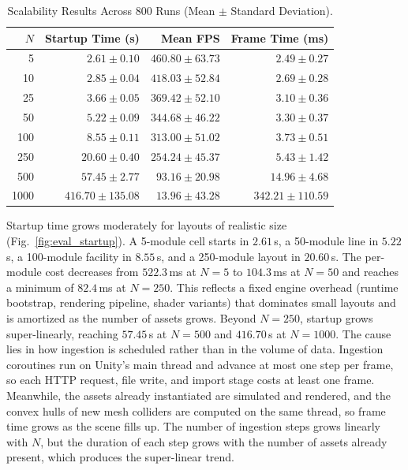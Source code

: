 \documentclass{ieeeojies}
\begin{document}
\begin{table}[t]
\centering
\caption{Scalability Results Across 800 Runs (Mean $\pm$ Standard Deviation).}
\label{tab:consolidated_results}
\renewcommand{\arraystretch}{1.25}
\begin{tabular*}{\columnwidth}{@{\extracolsep{\fill}}rrrr@{}}
\toprule
\textbf{$N$} & \textbf{Startup Time (s)} & \textbf{Mean FPS} & \textbf{Frame Time (ms)} \\
\midrule
5    & $2.61 \pm 0.10$     & $460.80 \pm 63.73$ & $2.49 \pm 0.27$    \\
10   & $2.85 \pm 0.04$     & $418.03 \pm 52.84$ & $2.69 \pm 0.28$    \\
25   & $3.66 \pm 0.05$     & $369.42 \pm 52.10$ & $3.10 \pm 0.36$    \\
50   & $5.22 \pm 0.09$     & $344.68 \pm 46.22$ & $3.30 \pm 0.37$    \\
100  & $8.55 \pm 0.11$     & $313.00 \pm 51.02$ & $3.73 \pm 0.51$    \\
250  & $20.60 \pm 0.40$    & $254.24 \pm 45.37$ & $5.43 \pm 1.42$    \\
500  & $57.45 \pm 2.77$    & $93.16 \pm 20.98$  & $14.96 \pm 4.68$   \\
1000 & $416.70 \pm 135.08$ & $13.96 \pm 43.28$  & $342.21 \pm 110.59$\\
\bottomrule
\end{tabular*}
\end{table}

Startup time grows moderately for layouts of realistic size (Fig.~\ref{fig:eval_startup}). A 5-module cell starts in $2.61$\,s, a 50-module line in $5.22$\,s, a 100-module facility in $8.55$\,s, and a 250-module layout in $20.60$\,s. The per-module cost decreases from $522.3$\,ms at $N=5$ to $104.3$\,ms at $N=50$ and reaches a minimum of $82.4$\,ms at $N=250$. This reflects a fixed engine overhead (runtime bootstrap, rendering pipeline, shader variants) that dominates small layouts and is amortized as the number of assets grows. Beyond $N=250$, startup grows super-linearly, reaching $57.45$\,s at $N=500$ and $416.70$\,s at $N=1000$. The cause lies in how ingestion is scheduled rather than in the volume of data. Ingestion coroutines run on Unity's main thread and advance at most one step per frame, so each HTTP request, file write, and import stage costs at least one frame. Meanwhile, the assets already instantiated are simulated and rendered, and the convex hulls of new mesh colliders are computed on the same thread, so frame time grows as the scene fills up. The number of ingestion steps grows linearly with $N$, but the duration of each step grows with the number of assets already present, which produces the super-linear trend.
\end{document}
